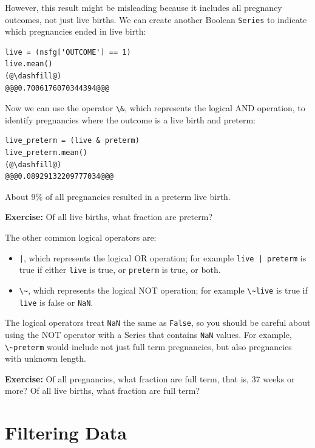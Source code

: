 However, this result might be misleading because it includes all
pregnancy outcomes, not just live births. We can create another Boolean
\passthrough{\lstinline!Series!} to indicate which pregnancies ended in
live birth:

\begin{lstlisting}[]
live = (nsfg['OUTCOME'] == 1)
live.mean()
(@\dashfill@)
@@@0.7006176070344394@@@
\end{lstlisting}

Now we can use the operator \passthrough{\lstinline!\&!}, which
represents the logical AND operation, to identify pregnancies where the
outcome is a live birth and preterm:

\begin{lstlisting}[]
live_preterm = (live & preterm)
live_preterm.mean()
(@\dashfill@)
@@@0.08929132209777034@@@
\end{lstlisting}

About 9\% of all pregnancies resulted in a preterm live birth.

\textbf{Exercise:} Of all live births, what fraction are preterm?

The other common logical operators are:

\begin{itemize}
\item
  \passthrough{\lstinline!|!}, which represents the logical OR
  operation; for example \passthrough{\lstinline!live | preterm!} is
  true if either \passthrough{\lstinline!live!} is true, or
  \passthrough{\lstinline!preterm!} is true, or both.
\item
  \passthrough{\lstinline!\~!}, which represents the logical NOT
  operation; for example \passthrough{\lstinline!\~live!} is true if
  \passthrough{\lstinline!live!} is false or
  \passthrough{\lstinline!NaN!}.
\end{itemize}

The logical operators treat \passthrough{\lstinline!NaN!} the same as
\passthrough{\lstinline!False!}, so you should be careful about using
the NOT operator with a Series that contains
\passthrough{\lstinline!NaN!} values. For example,
\passthrough{\lstinline!\~preterm!} would include not just full term
pregnancies, but also pregnancies with unknown length.

\textbf{Exercise:} Of all pregnancies, what fraction are full term, that
is, 37 weeks or more? Of all live births, what fraction are full term?

\hypertarget{filtering-data}{%
\section{Filtering Data}\label{filtering-data}}

